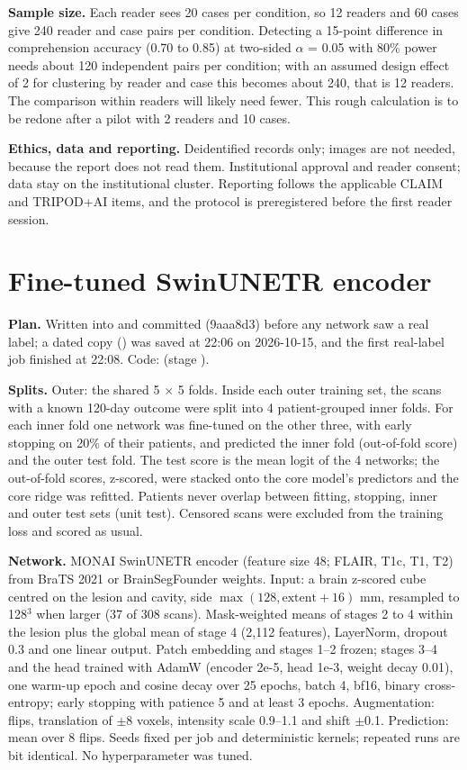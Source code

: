 \documentclass[11pt,a4paper]{article}
\begin{document}
\textbf{Sample size.} Each reader sees 20 cases per condition, so 12 readers and 60 cases give 240 reader and case
pairs per condition. Detecting a 15-point difference in comprehension accuracy (0.70 to 0.85) at two-sided
$\alpha$ = 0.05 with 80\% power needs about 120 independent pairs per condition; with an assumed design effect of 2
for clustering by reader and case this becomes about 240, that is 12 readers. The comparison within readers will
likely need fewer. This rough calculation is to be redone after a pilot with 2 readers and 10 cases.

\textbf{Ethics, data and reporting.} Deidentified records only; images are not needed, because the report does not
read them. Institutional approval and reader consent; data stay on the institutional cluster. Reporting follows the
applicable CLAIM and TRIPOD+AI items, and the protocol is preregistered before the first reader session.

\FloatBarrier
\section{Fine-tuned SwinUNETR encoder}\label{sec:S22}

\textbf{Plan.} Written into  and committed (9aaa8d3) before any network saw a
real label; a dated copy () was saved at 22:06 on 2026-10-15, and the first real-label job
finished at 22:08. Code:  (stage ).

\textbf{Splits.} Outer: the shared 5 $\times$ 5 folds. Inside each outer training set, the scans with a known
120-day outcome were split into 4 patient-grouped inner folds. For each inner fold one network was fine-tuned on the
other three, with early stopping on 20\% of their patients, and predicted the inner fold (out-of-fold score) and the
outer test fold. The test score is the mean logit of the 4 networks; the out-of-fold scores, z-scored, were stacked
onto the core model's predictors and the core ridge was refitted. Patients never overlap between fitting, stopping,
inner and outer test sets (unit test). Censored scans were excluded from the training loss and scored as usual.

\textbf{Network.} MONAI SwinUNETR encoder (feature size 48; FLAIR, T1c, T1, T2) from BraTS 2021 or BrainSegFounder
weights. Input: a brain z-scored cube centred on the lesion and cavity, side $\max(128, \text{extent} + 16)$ mm,
resampled to 128$^3$ when larger (37 of 308 scans). Mask-weighted means of stages 2 to 4 within the lesion plus the
global mean of stage 4 (2,112 features), LayerNorm, dropout 0.3 and one linear output. Patch embedding and stages 1--2
frozen; stages 3--4 and the head trained with AdamW (encoder 2e-5, head 1e-3, weight decay 0.01), one warm-up epoch
and cosine decay over 25 epochs, batch 4, bf16, binary cross-entropy; early stopping with patience 5 and at least 3
epochs. Augmentation: flips, translation of $\pm$8 voxels, intensity scale 0.9--1.1 and shift $\pm$0.1. Prediction:
mean over 8 flips. Seeds fixed per job and deterministic kernels; repeated runs are bit identical. No hyperparameter
was tuned.
\end{document}
